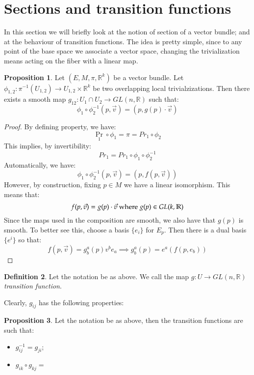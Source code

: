 \documentclass[12pt,a4paper]{report}
\theoremstyle{definition}
\newtheorem{Def}{Definition}[chapter]
\theoremstyle{Theorem}
\newtheorem{Prop}[Def]{Proposition}
\theoremstyle{break}
\theoremstyle{definition}
\begin{document}
	\section{Sections and transition functions}
		In this section we will briefly look at the notion of section of a vector bundle; and at the behaviour of transition functions. The idea is pretty simple, since to any point of the base space we associate a vector space, changing the trivialization means acting on the fiber with a linear map.
		\begin{Prop}
			Let $(E,M,\pi,\mathbb{R}^k)$ be a vector bundle. Let $\phi_{1,2}:\pi^{-1}(U_{1,2})\rightarrow U_{1,2}\times \mathbb{R}^k$ be two overlapping local trivialzizations. Then there exists a smooth map $g_{12}:U_1\cap U_2\rightarrow GL(n,\mathbb{R})$ such that:
			$$\phi_1\circ \phi_2^{-1}(p,\vec{v})=(p,g(p)\cdot \vec{v})$$
		\end{Prop}
		\begin{proof}
			By defining property, we have:
			$$\Pr_1\circ \phi_1=\pi=Pr_1\circ \phi_2$$
			This implies, by invertibility:
			$$Pr_1=Pr_1\circ \phi_1\circ \phi_2^{-1}$$
			Automatically, we have:
			$$\phi_1\circ \phi_2^{-1}(p,\vec{v})=(p,f(p,\vec{v}))$$
			However, by construction, fixing $p\in M$ we have a linear isomorphism. This means that:
			$$f(p,\vec{v})=g(p)\cdot \vec{v}\hbox{ where }g(p)\in GL(k,\mathbb{R})$$
			Since the maps used in the composition are smooth, we also have that $g(p)$ is smooth. To better see this, choose a basis $\{e_i\}$ for $E_p$. Then there is a dual basis $\{e^i\}$ so that:
			$$f(p,\vec{v})=g^a_b(p)v^be_a\implies g^a_b(p)=e^a(f(p,e_b))$$
		\end{proof}
		\begin{Def}
			Let the notation be as above. We call the map $g:U\rightarrow GL(n,\mathbb{R})$ \textit{transition function}.
		\end{Def}
		Clearly, $g_{ij}$ has the following properties:
		\begin{Prop}
			Let the notation be as above, then the transition functions are such that:
			\begin{itemize}
				\item $g_{ij}^{-1}=g_{ji}$;
				\item $g_{ik}\circ g_{kj}=$
			\end{itemize}
		\end{Prop} 
\end{document}
